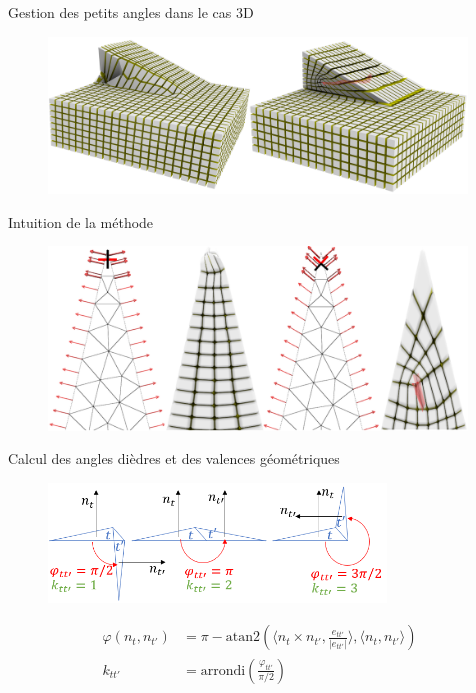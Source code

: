 \begin{frame}{Gestion des petits angles dans le cas 3D}

    \begin{figure}
        \centering
        \includegraphics[width=0.99\textwidth]{img/hexmeshing_ff/tremplin_solved_2.PNG}
    \end{figure}
    
\end{frame}

\begin{frame}{Intuition de la méthode}

    \begin{figure}
        \centering
        \includegraphics[width=0.99\textwidth]{img/hexmeshing_ff/normal_alignment_with_hexes_2.PNG}
    \end{figure}
    
\end{frame}

\begin{frame}{Calcul des angles dièdres et des valences géométriques}

    \begin{figure}
        \centering
        \includegraphics[width=0.8\textwidth]{img/hexmeshing_ff/phi_angles.PNG}
    \end{figure}
    
   
    \begin{align*}
        \varphi(n_t, n_{t'}) &= \pi - \mathrm{atan2} \left( \langle n_t \times n_{t'}, \frac{e_{tt'}}{\left|e_{tt'}\right|} \rangle, \langle n_t , n_{t'} \rangle \right)\\
        k_{tt'} &= \text{arrondi}( \frac{\varphi_{tt'}}{\pi/2} )
    \end{align*}
\end{frame}

